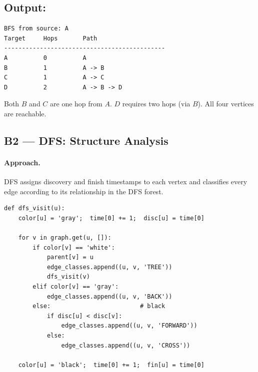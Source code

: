 \documentclass[11pt,a4paper]{article}
\begin{document}
\subsection{Output:}
\begin{lstlisting}[style=output]
BFS from source: A
Target     Hops       Path
---------------------------------------------
A          0          A
B          1          A -> B
C          1          A -> C
D          2          A -> B -> D
\end{lstlisting}

Both $B$ and $C$ are one hop from $A$. $D$ requires two hops (via $B$). All four vertices are reachable.

\subsection{B2 --- DFS: Structure Analysis}

\paragraph{Approach.}  DFS assigns discovery and finish timestamps to each vertex and classifies every edge according to its relationship in the DFS forest.

\begin{lstlisting}[style=python, caption={DFS visit routine (src/b2\_dfs.py).}]
def dfs_visit(u):
    color[u] = 'gray';  time[0] += 1;  disc[u] = time[0]

    for v in graph.get(u, []):
        if color[v] == 'white':
            parent[v] = u
            edge_classes.append((u, v, 'TREE'))
            dfs_visit(v)
        elif color[v] == 'gray':
            edge_classes.append((u, v, 'BACK'))
        else:                         # black
            if disc[u] < disc[v]:
                edge_classes.append((u, v, 'FORWARD'))
            else:
                edge_classes.append((u, v, 'CROSS'))

    color[u] = 'black';  time[0] += 1;  fin[u] = time[0]
\end{lstlisting}
\end{document}
